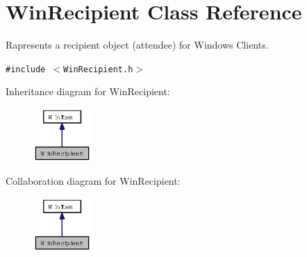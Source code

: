 \section{Win\-Recipient Class Reference}
\label{classWinRecipient}
Rapresents a recipient object (attendee) for Windows Clients.  


{\tt \#include $<$Win\-Recipient.h$>$}

Inheritance diagram for Win\-Recipient:\begin{figure}[H]
\begin{center}
\leavevmode
\includegraphics[width=62pt]{classWinRecipient__inherit__graph}
\end{center}
\end{figure}
Collaboration diagram for Win\-Recipient:\begin{figure}[H]
\begin{center}
\leavevmode
\includegraphics[width=62pt]{classWinRecipient__coll__graph}
\end{center}
\end{figure}
